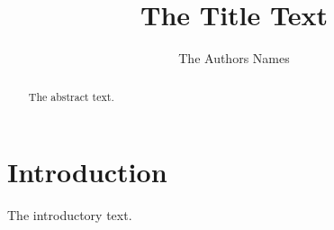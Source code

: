 \documentclass{article}
\title{The Title Text}
\date{}
\author{The Authors Names}
\begin{document}
\maketitle
\begin{abstract}
The abstract text.
\end{abstract}
\section{Introduction}
The introductory text.
\end{document}
